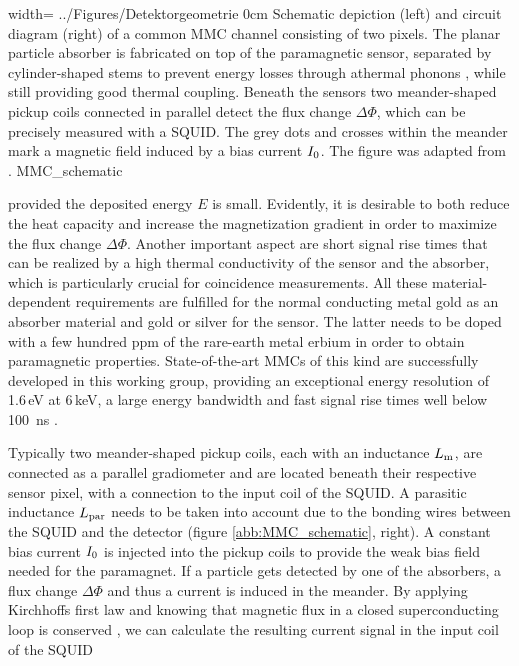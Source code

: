 
{width=\textwidth}
{../Figures/Detektorgeometrie}
{0cm}
{Schematic depiction (left) and circuit diagram (right) of a common MMC channel consisting of two pixels. The planar particle absorber is fabricated on top of the paramagnetic sensor, separated by cylinder-shaped stems to prevent energy losses through athermal phonons \cite{Fle09}, while still providing good thermal coupling. Beneath the sensors two meander-shaped pickup coils connected in parallel detect the flux change $\Delta\Phi$, which can be precisely measured with a SQUID. The grey dots and crosses within the meander mark a magnetic field induced by a bias current $I_{\rm 0}$. The figure was adapted from \cite{Bauer2022}.} 
{MMC_schematic}

provided the deposited energy $E$ is small. Evidently, it is desirable to both reduce the heat capacity and increase the magnetization gradient in order to maximize the flux change $\Delta\Phi$. Another important aspect are short signal rise times that can be realized by a high thermal conductivity of the sensor and the absorber, which is particularly crucial for coincidence measurements. All these material-dependent requirements are fulfilled for the normal conducting metal gold as an absorber material and gold or silver for the sensor. The latter needs to be doped with a few hundred ppm of the rare-earth metal erbium in order to obtain paramagnetic properties. State-of-the-art MMCs of this kind are successfully developed in this working group, providing an exceptional energy resolution of 1.6\,eV at 6\,keV, a large energy bandwidth and fast signal rise times well below \qty{100}{\nano\s} \cite{Kempf2018}. 

Typically two meander-shaped pickup coils, each with an inductance $L_{\rm m}$, are connected as a parallel gradiometer and are located beneath their respective sensor pixel, with a connection to the input coil of the SQUID. A parasitic inductance $L_{\rm par}$ needs to be taken into account due to the bonding wires between the SQUID and the detector (figure \ref{abb:MMC_schematic}, right). A constant bias current $I_{\rm 0}$ is injected into the pickup coils to provide the weak bias field needed for the paramagnet. If a particle gets detected by one of the absorbers, a flux change $\Delta\Phi$ and thus a current is induced in the meander. By applying Kirchhoffs first law and knowing that magnetic flux in a closed superconducting loop is conserved \cite{Landau1960}, we can calculate the resulting current signal in the input coil of the SQUID \cite{Burck2004}

